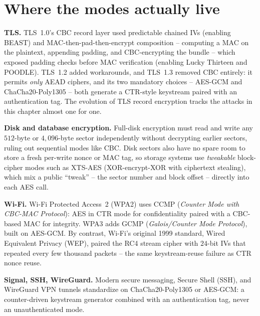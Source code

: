 \section{Where the modes actually live}

\begin{applicationbox}
\textbf{TLS.} TLS~1.0's CBC record layer used predictable chained IVs (enabling BEAST) and MAC-then-pad-then-encrypt composition -- computing a MAC on the plaintext, appending padding, and CBC-encrypting the bundle -- which exposed padding checks before MAC verification (enabling Lucky Thirteen and POODLE). TLS~1.2 added workarounds, and TLS~1.3 removed CBC entirely: it permits \emph{only} AEAD ciphers, and its two mandatory choices -- AES-GCM and ChaCha20-Poly1305 -- both generate a CTR-style keystream paired with an authentication tag. The evolution of TLS record encryption tracks the attacks in this chapter almost one for one.

\textbf{Disk and database encryption.} Full-disk encryption must read and write any $512$-byte or $4{,}096$-byte sector independently without decrypting earlier sectors, ruling out sequential modes like CBC. Disk sectors also have no spare room to store a fresh per-write nonce or MAC tag, so storage systems use \emph{tweakable} block-cipher modes such as XTS-AES (XOR-encrypt-XOR with ciphertext stealing), which mix a public ``tweak'' -- the sector number and block offset -- directly into each AES call.

\textbf{Wi-Fi.} Wi-Fi Protected Access~2 (WPA2) uses CCMP (\emph{Counter Mode with CBC-MAC Protocol}): AES in CTR mode for confidentiality paired with a CBC-based MAC for integrity. WPA3 adds GCMP (\emph{Galois/Counter Mode Protocol}), built on AES-GCM. By contrast, Wi-Fi's original 1999 standard, Wired Equivalent Privacy (WEP), paired the RC4 stream cipher with $24$-bit IVs that repeated every few thousand packets -- the same keystream-reuse failure as CTR nonce reuse.

\textbf{Signal, SSH, WireGuard.} Modern secure messaging, Secure Shell (SSH), and WireGuard VPN tunnels standardize on ChaCha20-Poly1305 or AES-GCM: a counter-driven keystream generator combined with an authentication tag, never an unauthenticated mode.
\end{applicationbox}

